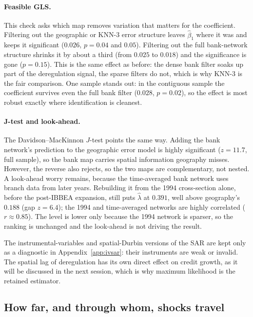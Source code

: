 \paragraph{Feasible GLS.} This check asks which map removes variation that matters
for the coefficient. Filtering out the geographic or KNN-3 error structure leaves
$\hat\beta_1$ where it was and keeps it significant ($0.026$, $p=0.04$ and $0.05$).
Filtering out the full bank-network structure shrinks it by about a third (from $0.025$ to $0.018$) and the significance is gone ($p=0.15$). This is the
same effect as before: the dense bank filter soaks up part of the deregulation
signal, the sparse filters do not, which is why KNN-3 is the fair comparison. One
sample stands out: in the contiguous sample the coefficient survives even the full
bank filter ($0.028$, $p=0.02$), so the effect is most robust exactly where identification is cleanest.

\paragraph{J-test and look-ahead.} The Davidson--MacKinnon $J$-test points the same
way. Adding the bank network's prediction to the geographic error model is highly
significant ($z=11.7$, full sample), so the bank map carries spatial information
geography misses. However, the reverse also rejects, so the two maps are complementary, not
nested. A look-ahead worry remains, because the time-averaged bank network uses
branch data from later years. Rebuilding it from the 1994 cross-section alone, before
the post-IBBEA expansion, still puts $\hat\lambda$ at $0.391$, well above
geography's $0.188$ (gap $z=6.4$); the 1994 and time-averaged networks are highly
correlated ($r\approx0.85$). The level is lower only because the 1994 network is sparser, so the ranking is unchanged and the look-ahead is not driving the result.

The instrumental-variables and spatial-Durbin versions of the SAR are kept only as a
diagnostic in Appendix~\ref{app:ivsar}: their instruments are weak or invalid. The
spatial lag of deregulation has its own direct effect on credit growth, as it will be discussed in the next session, which is why maximum likelihood is the retained estimator.

\subsection{How far, and through whom, shocks travel}
\label{sec:reach-results}

